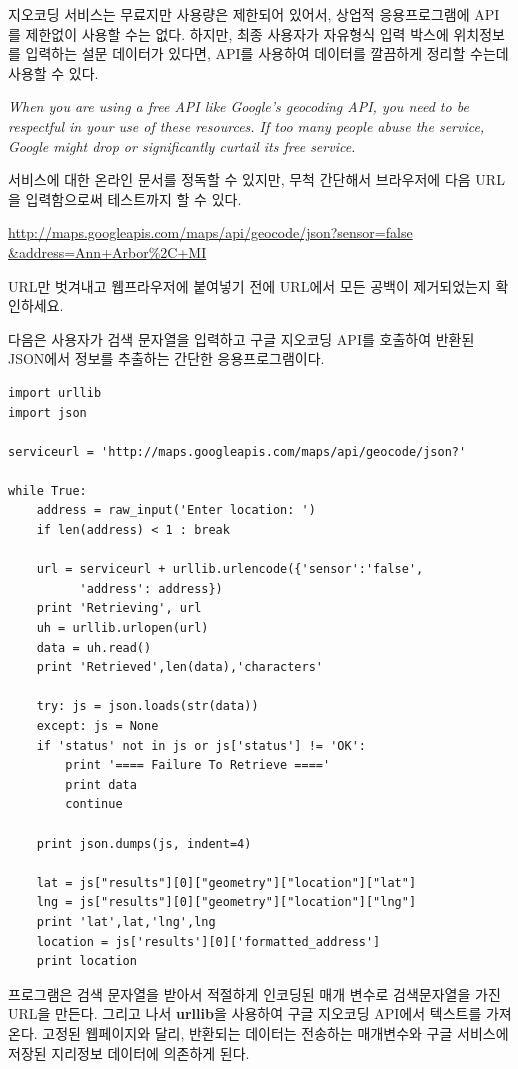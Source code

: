 지오코딩 서비스는 무료지만 사용량은 제한되어 있어서, 상업적 응용프로그램에 API를 제한없이 사용할 수는 없다.
하지만, 최종 사용자가 자유형식 입력 박스에 위치정보를 입력하는 설문 데이터가 있다면,
API를 사용하여 데이터를 깔끔하게 정리할 수는데 사용할 수 있다.

{\em When you are using a free API like Google's geocoding API, you need
to be respectful in your use of these resources.  If too many people abuse the
service, Google might drop or significantly curtail its free service.}

서비스에 대한 온라인 문서를 정독할 수 있지만, 무척 간단해서 브라우저에 다음 URL을 입력함으로써 테스트까지 할 수 있다.

\url{http://maps.googleapis.com/maps/api/geocode/json?sensor=false &address=Ann+Arbor%2C+MI}

URL만 벗겨내고 웹프라우저에 붙여넣기 전에 URL에서 모든 공백이 제거되었는지 확인하세요.

다음은 사용자가 검색 문자열을 입력하고 구글 지오코딩 API를 호출하여 반환된 JSON에서 정보를 추출하는 
간단한 응용프로그램이다.

\beforeverb
\begin{verbatim}
import urllib
import json

serviceurl = 'http://maps.googleapis.com/maps/api/geocode/json?'

while True:
    address = raw_input('Enter location: ')
    if len(address) < 1 : break

    url = serviceurl + urllib.urlencode({'sensor':'false', 
          'address': address})
    print 'Retrieving', url
    uh = urllib.urlopen(url)
    data = uh.read()
    print 'Retrieved',len(data),'characters'

    try: js = json.loads(str(data))
    except: js = None
    if 'status' not in js or js['status'] != 'OK':
        print '==== Failure To Retrieve ===='
        print data
        continue

    print json.dumps(js, indent=4)

    lat = js["results"][0]["geometry"]["location"]["lat"]
    lng = js["results"][0]["geometry"]["location"]["lng"]
    print 'lat',lat,'lng',lng
    location = js['results'][0]['formatted_address']
    print location
\end{verbatim}
\afterverb
%

프로그램은 검색 문자열을 받아서 적절하게 인코딩된 매개 변수로 검색문자열을 가진 URL을 만든다.
그리고 나서 {\bf urllib}을 사용하여 구글 지오코딩 API에서 텍스트를 가져온다.
고정된 웹페이지와 달리, 반환되는 데이터는 전송하는 매개변수와 구글 서비스에 저장된 지리정보 데이터에
의존하게 된다.

